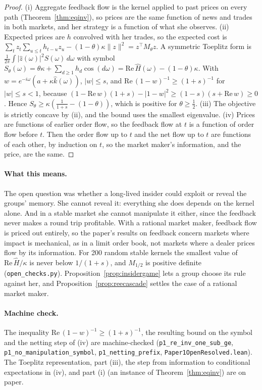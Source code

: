\begin{proof}
(i) Aggregate feedback flow is the kernel applied to past prices on every path (Theorem~\ref{thm:eqinv}), so prices are the same function of news and trades in both markets, and her strategy is a function of what she observes. (ii) Expected prices are $h$ convolved with her trades, so the expected cost is $\sum_tz_t\sum_{u\le t}h_{t-u}z_u-(1-\theta)\kappa\|z\|^2=z^\top M_\theta z$. A symmetric Toeplitz form is $\frac1{2\pi}\int|\hat z(\omega)|^2S(\omega)\,d\omega$ with symbol $S_\theta(\omega)=\theta\kappa+\sum_{d\ge1}h_d\cos(d\omega)=\mathrm{Re}\,\hat H(\omega)-(1-\theta)\kappa$. With $w=e^{-i\omega}(a+\kappa\hat k(\omega))$, $|w|\le s$, and $\mathrm{Re}\,(1-w)^{-1}\ge(1+s)^{-1}$ for $|w|\le s<1$, because $(1-\mathrm{Re}\,w)(1+s)-|1-w|^2\ge(1-s)(s+\mathrm{Re}\,w)\ge0$. Hence $S_\theta\ge\kappa(\frac1{1+s}-(1-\theta))$, which is positive for $\theta\ge\frac12$. (iii) The objective is strictly concave by (ii), and the bound uses the smallest eigenvalue. (iv) Prices are functions of earlier order flow, so the feedback flow at $t$ is a function of order flow before $t$. Then the order flow up to $t$ and the net flow up to $t$ are functions of each other, by induction on $t$, so the market maker's information, and the price, are the same.
\end{proof}

\paragraph{What this means.} The open question was whether a long-lived insider could exploit or reveal the groups' memory. She cannot reveal it: everything she does depends on the kernel alone. And in a stable market she cannot manipulate it either, since the feedback never makes a round trip profitable. With a rational market maker, feedback flow is priced out entirely, so the paper's results on feedback concern markets where impact is mechanical, as in a limit order book, not markets where a dealer prices flow by its information. For 200 random stable kernels the smallest value of $\mathrm{Re}\,\hat H/\kappa$ is never below $1/(1+s)$, and $M_{1/2}$ is positive definite (\nolinkurl{open_checks.py}). Proposition~\ref{prop:insidergame} lets a group choose its rule against her, and Proposition~\ref{prop:reecascade} settles the case of a rational market maker.

\paragraph{Machine check.} The inequality $\mathrm{Re}\,(1-w)^{-1}\ge(1+s)^{-1}$, the resulting bound on the symbol and the netting step of (iv) are machine-checked (\texttt{p1\_re\_inv\_one\_sub\_ge}, \texttt{p1\_no\_manipulation\_symbol}, \texttt{p1\_netting\_prefix}, \nolinkurl{Paper1OpenResolved.lean}). The Toeplitz representation, part (iii), the step from information to conditional expectations in (iv), and part (i) (an instance of Theorem~\ref{thm:eqinv}) are on paper.

